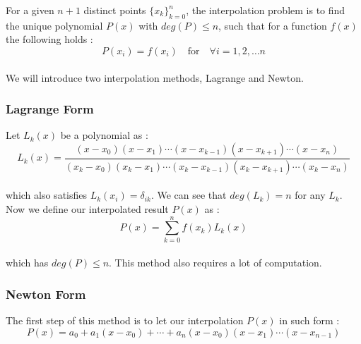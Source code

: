 \documentclass[paper=a4, fontsize=11pt]{scrartcl}
\begin{document}
For a given $n+1$ distinct points $\{x_k\}_{k=0}^n$, the interpolation problem is to find the unique polynomial $P(x)$ with $deg(P) \leq n$, such that for a function $f(x)$ the following holds : \\

\begin{equation}\nonumber
	P(x_i) = f(x_i) \quad \text{for} \quad \forall i = 1,2 , \dots n
\end{equation}\\

We will introduce two interpolation methods, Lagrange and Newton. 

\vspace{0.15in}
\subsubsection{Lagrange Form}
\vspace{0.15in}
Let $L_k(x)$ be a polynomial as :\\

\begin{equation}\nonumber
	L_k(x) = \frac{(x - x_0)(x - x_1) \cdots (x - x_{k-1})(x - x_{k+1}) \cdots (x - x_n)}{(x_k - x_0)(x_k - x_1) \cdots (x_k - x_{k-1})(x_k - x_{k+1}) \cdots (x_k - x_n)}
\end{equation}\\

which also satisfies $L_k(x_i) = \delta_{ik}$. We can see that $deg(L_k) = n$ for any $L_k$. Now we define our interpolated result $P(x)$ as :\\

\begin{equation}\nonumber
	P(x) = \sum^{n}_{k=0} f(x_k) L_k(x)
\end{equation}\\

which has $deg(P) \leq n$. This method also requires a lot of computation.\\

\vspace{0.15in}
\subsubsection{Newton Form}
\vspace{0.15in}
The first step of this method is to let our interpolation $P(x)$ in such form :\\

\begin{equation}\nonumber
	P(x) = a_0 + a_1 (x-x_0)+  \cdots + a_n (x-x_0)(x-x_1) \cdots (x-x_{n-1})
\end{equation}\\
\end{document}

